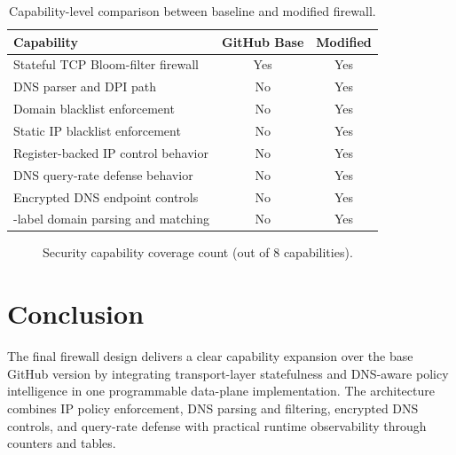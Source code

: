 \documentclass[sigconf,nonacm]{acmart}
\begin{document}
\begin{table}[H]
\caption{Capability-level comparison between baseline and modified firewall.}
\label{tab:capability}
\centering
\small
\begin{tabular}{>{\raggedright\arraybackslash}p{}cc}
\toprule
\textbf{Capability} & \textbf{GitHub Base} & \textbf{Modified} \\
\midrule
Stateful TCP Bloom-filter firewall & Yes & Yes \\
DNS parser and DPI path & No & Yes \\
Domain blacklist enforcement & No & Yes \\
Static IP blacklist enforcement & No & Yes \\
Register-backed IP control behavior & No & Yes \\
DNS query-rate defense behavior & No & Yes \\
Encrypted DNS endpoint controls & No & Yes \\
4-label domain parsing and matching & No & Yes \\
\bottomrule
\end{tabular}
\end{table}

\begin{figure}[H]
\centering
{}
\caption{Security capability coverage count (out of 8 capabilities).}
\label{fig:coverage}
\end{figure}

\section{Conclusion}
The final firewall design delivers a clear capability expansion over the base
GitHub version by integrating transport-layer statefulness and DNS-aware policy
intelligence in one programmable data-plane implementation. The architecture
combines IP policy enforcement, DNS parsing and filtering, encrypted DNS controls,
and query-rate defense with practical runtime observability through counters and
tables.
\end{document}
